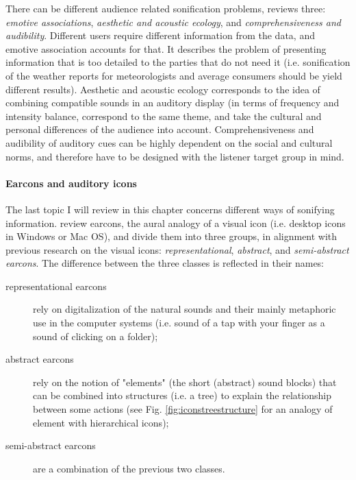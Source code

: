 There can be different audience related sonification problems, \parencite{hermann_sonification_2011} reviews three: \textit{emotive associations}, \textit{aesthetic and acoustic ecology}, and \textit{comprehensiveness and audibility}. Different users require different information from the data, and emotive association accounts for that. It describes the problem of presenting information that is too detailed to the parties that do not need it (i.e. sonification of the weather reports for meteorologists and average consumers should be yield different results). Aesthetic and acoustic ecology corresponds to the idea of combining compatible sounds in an auditory display (in terms of frequency and intensity balance, correspond to the same theme, and take the cultural and personal differences of the audience into account. Comprehensiveness and audibility of auditory cues can be highly dependent on the social and cultural norms, and therefore have to be designed with the listener target group in mind.

\paragraph[]{Earcons and auditory icons}
The last topic I will review in this chapter concerns different ways of sonifying information. \parencite{blattner_earcons_1989} review earcons, the aural analogy of a visual icon (i.e. desktop icons in Windows or Mac OS), and divide them into three groups, in alignment with previous research on the visual icons: \textit{representational}, \textit{abstract}, and \textit{semi-abstract earcons}. 
The difference between the three classes is reflected in their names:
\begin{description}
	\item[representational earcons] rely on digitalization of the natural sounds and their mainly metaphoric use in the computer systems (i.e. sound of a tap with your finger as a sound of clicking on a folder);
	
	\item[abstract earcons] rely on the notion of "elements" (the short (abstract) sound blocks) that can be combined into structures (i.e. a tree) to explain the relationship between some actions (see Fig. \ref{fig:iconstreestructure} for an analogy of element with hierarchical icons);
	
	\item[semi-abstract earcons] are a combination of the previous two classes.
\end{description}

